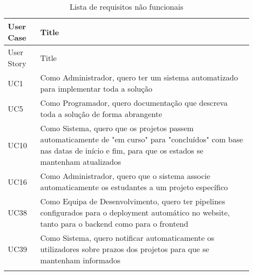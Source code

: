 \begin{landscape}
\begin{longtable}{lp{15cm}}
    \hline
    User Case & Title \\ \hline
    \endfirsthead

    \hline
    User Story & Title \\ \hline
    \endhead

    \hline
    \endfoot

    \hline
    \endlastfoot

    UC1 & Como Administrador, quero ter um sistema automatizado para implementar toda a solução \\ \hline
    UC5 & Como Programador, quero documentação que descreva toda a solução de forma abrangente \\ \hline
    UC10 & Como Sistema, quero que os projetos passem automaticamente de "em curso" para "concluídos" com base nas datas de início e fim, para que os estados se mantenham atualizados \\ \hline
    UC16 & Como Administrador, quero que o sistema associe automaticamente os estudantes a um projeto específico \\ \hline
    UC38 & Como Equipa de Desenvolvimento, quero ter pipelines configurados para o deployment automático no website, tanto para o backend como para o frontend \\ \hline
    UC39 & Como Sistema, quero notificar automaticamente os utilizadores sobre prazos dos projetos para que se mantenham informados \\ \hline

\caption{Lista de requisitos não funcionais}
\label{tab:req-nao-funcionais}
\end{longtable}
\end{landscape}
